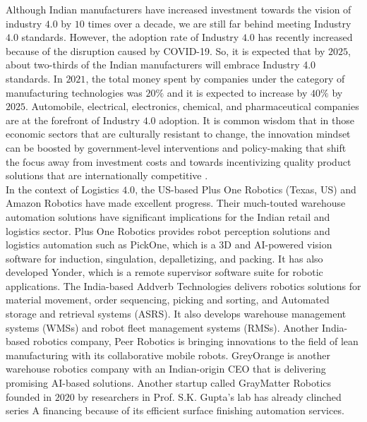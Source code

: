 \documentclass[paper=a4wide, fontsize=12pt]{scrartcl}	 %
\begin{document}
Although Indian manufacturers have increased investment towards the vision of industry $4.0$ by $10$ times over a decade, we are still far behind meeting Industry $4.0$ standards. However, the adoption rate of Industry $4.0$ has recently increased because of the disruption caused by COVID-19. So, it is expected that by $2025$, about two-thirds of the Indian manufacturers will embrace Industry 4.0 standards. In $2021$, the total money spent by companies under the category of manufacturing technologies was $20\%$ and it is expected to increase by $40\%$ by $2025$. Automobile, electrical, electronics, chemical, and pharmaceutical companies are at the forefront of Industry $4.0$ adoption. It is common wisdom that in those economic sectors that are culturally resistant to change, the innovation mindset can be boosted by government-level interventions and policy-making that shift the focus away from investment costs and towards incentivizing quality product solutions that are internationally competitive  \cite{nasscom}. \\

In the context of Logistics $4.0$, the US-based Plus One Robotics (Texas, US) and Amazon Robotics have made excellent progress. Their much-touted warehouse automation solutions have significant implications for the Indian retail and logistics sector. Plus One Robotics provides robot perception solutions and logistics automation such as PickOne, which is a 3D and AI-powered vision software for induction, singulation, depalletizing, and packing. It has also developed Yonder, which is a remote supervisor software suite for robotic applications. The India-based Addverb Technologies delivers robotics solutions for material movement, order sequencing, picking and sorting, and Automated storage and retrieval systems (ASRS). It also develops warehouse management systems (WMSs) and robot fleet management systems (RMSs). Another India-based robotics company, Peer Robotics is bringing innovations to the field of lean manufacturing with its collaborative mobile robots. GreyOrange is another warehouse robotics company with an Indian-origin CEO that is delivering promising AI-based solutions. Another startup called GrayMatter Robotics founded in $2020$ by researchers in Prof. S.K. Gupta's lab has already clinched series A financing because of its efficient surface finishing automation services. \\
\end{document}
